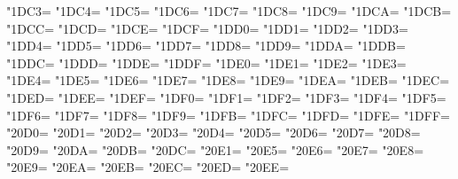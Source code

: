 \XeTeXcharclass"1DC3=\KclassCM
\XeTeXcharclass"1DC4=\KclassCM
\XeTeXcharclass"1DC5=\KclassCM
\XeTeXcharclass"1DC6=\KclassCM
\XeTeXcharclass"1DC7=\KclassCM
\XeTeXcharclass"1DC8=\KclassCM
\XeTeXcharclass"1DC9=\KclassCM
\XeTeXcharclass"1DCA=\KclassCM
\XeTeXcharclass"1DCB=\KclassCM
\XeTeXcharclass"1DCC=\KclassCM
\XeTeXcharclass"1DCD=\KclassCM
\XeTeXcharclass"1DCE=\KclassCM
\XeTeXcharclass"1DCF=\KclassCM
\XeTeXcharclass"1DD0=\KclassCM
\XeTeXcharclass"1DD1=\KclassCM
\XeTeXcharclass"1DD2=\KclassCM
\XeTeXcharclass"1DD3=\KclassCM
\XeTeXcharclass"1DD4=\KclassCM
\XeTeXcharclass"1DD5=\KclassCM
\XeTeXcharclass"1DD6=\KclassCM
\XeTeXcharclass"1DD7=\KclassCM
\XeTeXcharclass"1DD8=\KclassCM
\XeTeXcharclass"1DD9=\KclassCM
\XeTeXcharclass"1DDA=\KclassCM
\XeTeXcharclass"1DDB=\KclassCM
\XeTeXcharclass"1DDC=\KclassCM
\XeTeXcharclass"1DDD=\KclassCM
\XeTeXcharclass"1DDE=\KclassCM
\XeTeXcharclass"1DDF=\KclassCM
\XeTeXcharclass"1DE0=\KclassCM
\XeTeXcharclass"1DE1=\KclassCM
\XeTeXcharclass"1DE2=\KclassCM
\XeTeXcharclass"1DE3=\KclassCM
\XeTeXcharclass"1DE4=\KclassCM
\XeTeXcharclass"1DE5=\KclassCM
\XeTeXcharclass"1DE6=\KclassCM
\XeTeXcharclass"1DE7=\KclassCM
\XeTeXcharclass"1DE8=\KclassCM
\XeTeXcharclass"1DE9=\KclassCM
\XeTeXcharclass"1DEA=\KclassCM
\XeTeXcharclass"1DEB=\KclassCM
\XeTeXcharclass"1DEC=\KclassCM
\XeTeXcharclass"1DED=\KclassCM
\XeTeXcharclass"1DEE=\KclassCM
\XeTeXcharclass"1DEF=\KclassCM
\XeTeXcharclass"1DF0=\KclassCM
\XeTeXcharclass"1DF1=\KclassCM
\XeTeXcharclass"1DF2=\KclassCM
\XeTeXcharclass"1DF3=\KclassCM
\XeTeXcharclass"1DF4=\KclassCM
\XeTeXcharclass"1DF5=\KclassCM
\XeTeXcharclass"1DF6=\KclassCM
\XeTeXcharclass"1DF7=\KclassCM
\XeTeXcharclass"1DF8=\KclassCM
\XeTeXcharclass"1DF9=\KclassCM
\XeTeXcharclass"1DFB=\KclassCM
\XeTeXcharclass"1DFC=\KclassCM
\XeTeXcharclass"1DFD=\KclassCM
\XeTeXcharclass"1DFE=\KclassCM
\XeTeXcharclass"1DFF=\KclassCM
\XeTeXcharclass"20D0=\KclassCM
\XeTeXcharclass"20D1=\KclassCM
\XeTeXcharclass"20D2=\KclassCM
\XeTeXcharclass"20D3=\KclassCM
\XeTeXcharclass"20D4=\KclassCM
\XeTeXcharclass"20D5=\KclassCM
\XeTeXcharclass"20D6=\KclassCM
\XeTeXcharclass"20D7=\KclassCM
\XeTeXcharclass"20D8=\KclassCM
\XeTeXcharclass"20D9=\KclassCM
\XeTeXcharclass"20DA=\KclassCM
\XeTeXcharclass"20DB=\KclassCM
\XeTeXcharclass"20DC=\KclassCM
\XeTeXcharclass"20E1=\KclassCM
\XeTeXcharclass"20E5=\KclassCM
\XeTeXcharclass"20E6=\KclassCM
\XeTeXcharclass"20E7=\KclassCM
\XeTeXcharclass"20E8=\KclassCM
\XeTeXcharclass"20E9=\KclassCM
\XeTeXcharclass"20EA=\KclassCM
\XeTeXcharclass"20EB=\KclassCM
\XeTeXcharclass"20EC=\KclassCM
\XeTeXcharclass"20ED=\KclassCM
\XeTeXcharclass"20EE=\KclassCM
